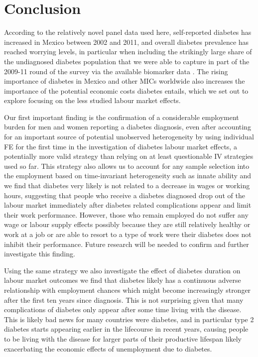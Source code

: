 \section{\noindent \label{sec:Conclusion}Conclusion}

According to the relatively novel panel data used here, self-reported diabetes has increased in Mexico between 2002 and 2011, and overall
diabetes prevalence has reached worrying
levels, in particular when including the strikingly large share of the undiagnosed diabetes population that we were able to capture in part of the 2009-11 round of the survey via the available biomarker data \citep{Frankenberg2015}. The rising importance of diabetes in Mexico and other \ac{MICs} worldwide also increases the importance of the potential economic costs diabetes entails, which we set out to explore focusing on the less studied labour market effects.

Our first important finding is the confirmation of a considerable employment burden for men and women reporting a diabetes diagnosis, even after accounting for an important source of potential unobserved heterogeneity by using individual \ac{FE} for the first time in the investigation of diabetes labour market effects, a potentially more valid strategy than relying on at least questionable \ac{IV} strategies used so far. This strategy also allows us to account for any sample selection into the employment based on time-invariant heterogeneity such as innate ability and we find that diabetes very likely is not related to a decrease in wages or working hours, suggesting that people who receive a diabetes diagnosed drop out of the labour market immediately after diabetes related complications appear and limit their work performance. However, those who remain employed do not suffer any wage or labour supply effects possibly  because they are still relatively healthy or work at a job or are able to resort to a type of work were their diabetes does not inhibit their performance. Future research will be needed to confirm and further investigate this finding.

Using the same strategy we also investigate the effect of diabetes duration on labour market outcomes we find that diabetes likely has a continuous adverse relationship with employment chances which might become increasingly stronger after the first ten years since diagnosis. This is not surprising given that many complications of diabetes only appear after some time living with the disease. This is likely bad news for many countries were diabetes, and in particular type 2 diabetes starts appearing earlier in the lifecourse in recent years, causing people to be living with the disease for larger parts of their productive lifespan likely exacerbating the economic effects of unemployment due to diabetes. 

